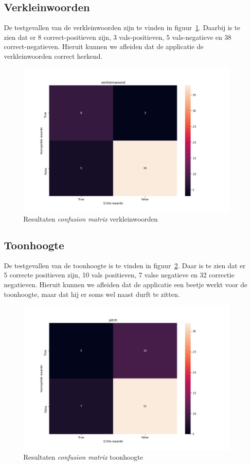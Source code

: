 \subsection{Verkleinwoorden}
De testgevallen van de verkleinwoorden zijn te vinden in figuur~\ref{fig:cfm_verkleinwoord}. Daarbij is te zien dat er 8 correct-positieven zijn, 3 vals-positieven, 5 vals-negatieve en 38 correct-negatieven.
Hieruit kunnen we afleiden dat de applicatie de verkleinwoorden correct herkend.
\begin{figure}
	\centering
	\includegraphics[width=1\textwidth]{./img/cfm_verkleinwoord}
	\caption{\label{fig:cfm_verkleinwoord} Resultaten \textit{confusion matrix} verkleinwoorden}
\end{figure}


\subsection{Toonhoogte}
De testgevallen van de toonhoogte is te vinden in figuur~\ref{fig:cfm_pitch}. Daar is te zien dat er 5 correcte positieven zijn, 10 vals positieven, 7 valse negatieve en 32 correctie negatieven.
Hieruit kunnen we afleiden dat de applicatie een beetje werkt voor de toonhoogte, maar dat hij er soms wel naast durft te zitten.
\begin{figure}
	\centering
	\includegraphics[width=1\textwidth]{./img/cfm_pitch}
	\caption{\label{fig:cfm_pitch} Resultaten \textit{confusion matrix} toonhoogte}
\end{figure}

